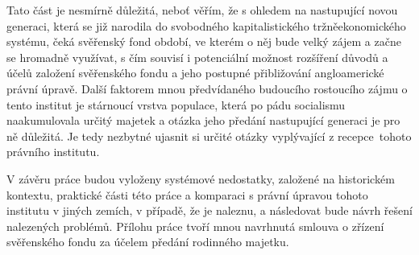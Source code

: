 \documentclass{article}
\begin{document}
\indent Tato část je nesmírně důležitá, neboť věřím, že s ohledem na nastupující novou generaci, která se již narodila do svobodného kapitalistického tržněeko\-nomického systému, čeká svěřenský fond období, ve kterém o něj bude velký zájem a začne se hromadně využívat, s čím souvisí i potenciální možnost rozšíření důvodů a účelů založení svěřenského fondu a jeho postupné přibližování angloamerické právní úpravě. Další faktorem mnou předvídaného budoucího rostoucího zájmu o tento institut je stárnoucí vrstva populace, která po pádu soci\-alismu naakumulovala určitý majetek a otázka jeho předání nastupující generaci je pro ně důležitá. Je tedy nezbytné ujasnit si určité otázky vyplývající z recepce\ tohoto právního institutu. \\
\linebreak

\indent V závěru práce budou vyloženy systémové nedostatky, založené na historickém kontextu, praktické části této práce a komparaci s právní úpravou tohoto institutu v jiných zemích, v případě, že je naleznu, a následovat bude návrh řešení nalezených problémů. Přílohu práce tvoří mnou navrhnutá smlouva o zřízení svěřenského fondu za účelem předání rodinného majetku.



\end{document}
